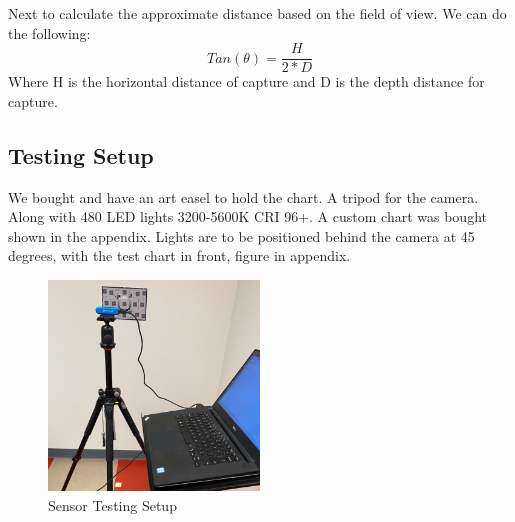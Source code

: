 Next to calculate the approximate distance based on the field of view. We can do the following:
\begin{equation}
	Tan(\theta) = \frac{H}{2 * D}
\end{equation}
Where H is the horizontal distance of capture and D is the depth distance for capture.
\subsection{Testing Setup}
We bought and have an art easel to hold the chart. A tripod for the camera. Along with 480 LED lights 3200-5600K CRI 96+. A custom chart was bought shown in the appendix. Lights are to be positioned behind the camera at 45 degrees, with the test chart in front, figure in appendix. 
\begin{figure}[h]
	\caption{Sensor Testing Setup}
	\centering
	\includegraphics[width=0.5\textwidth, angle=0]{images/sensor_testing.png}
\end{figure}

